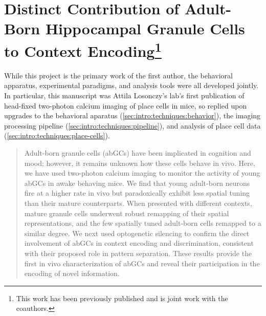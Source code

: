 \section[Distinct Contribution of Adult-Born Hippocampal Granule Cells to Context Encoding]{Distinct Contribution of Adult-Born Hippocampal Granule Cells to Context Encoding\footnote{This work has been previously published \citep{Danielson2016a} and is joint work with the coauthors.}}

While this project is the primary work of the first author, the behavioral apparatus, experimental paradigms, and analysis tools were all developed jointly.
In particular, this manuscript was Attila Losonczy's lab's first publication of head-fixed two-photon calcium imaging of place cells in mice, so replied upon upgrades to the behavioral aparatus (\autoref{sec:intro:techniques:behavior}), the imaging processing pipeline (\autoref{sec:intro:techniques:pipeline}), and analysis of place cell data (\autoref{sec:intro:techniques:place-cells}).

\begin{quote}
Adult-born granule cells (abGCs) have been implicated in cognition and mood; however, it remains unknown how these cells behave in vivo. Here, we have used two-photon calcium imaging to monitor the activity of young abGCs in awake behaving mice. We find that young adult-born neurons fire at a higher rate in vivo but paradoxically exhibit less spatial tuning than their mature counterparts. When presented with different contexts, mature granule cells underwent robust remapping of their spatial representations, and the few spatially tuned adult-born cells remapped to a similar degree. We next used optogenetic silencing to confirm the direct involvement of abGCs in context encoding and discrimination, consistent with their proposed role in pattern separation. These results provide the first in vivo characterization of abGCs and reveal their participation in the encoding of novel information.
\end{quote}

